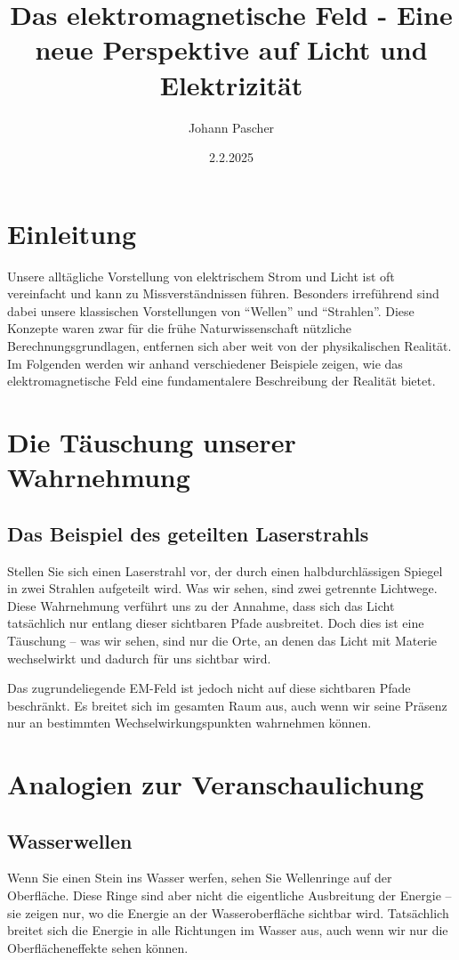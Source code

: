\documentclass[12pt,a4paper]{article}
\title{Das elektromagnetische Feld - Eine neue Perspektive auf Licht und Elektrizität}
\author{Johann Pascher}
\date{2.2.2025}
\begin{document}
\maketitle

\section*{Einleitung}
Unsere alltägliche Vorstellung von elektrischem Strom und Licht ist oft vereinfacht und kann zu Missverständnissen führen. Besonders irreführend sind dabei unsere klassischen Vorstellungen von ``Wellen'' und ``Strahlen''. Diese Konzepte waren zwar für die frühe Naturwissenschaft nützliche Berechnungsgrundlagen, entfernen sich aber weit von der physikalischen Realität. Im Folgenden werden wir anhand verschiedener Beispiele zeigen, wie das elektromagnetische Feld eine fundamentalere Beschreibung der Realität bietet.

\section{Die Täuschung unserer Wahrnehmung}
\subsection{Das Beispiel des geteilten Laserstrahls}
Stellen Sie sich einen Laserstrahl vor, der durch einen halbdurchlässigen Spiegel in zwei Strahlen aufgeteilt wird. Was wir sehen, sind zwei getrennte Lichtwege. Diese Wahrnehmung verführt uns zu der Annahme, dass sich das Licht tatsächlich nur entlang dieser sichtbaren Pfade ausbreitet. Doch dies ist eine Täuschung -- was wir sehen, sind nur die Orte, an denen das Licht mit Materie wechselwirkt und dadurch für uns sichtbar wird.

Das zugrundeliegende EM-Feld ist jedoch nicht auf diese sichtbaren Pfade beschränkt. Es breitet sich im gesamten Raum aus, auch wenn wir seine Präsenz nur an bestimmten Wechselwirkungspunkten wahrnehmen können.

\section{Analogien zur Veranschaulichung}
\subsection{Wasserwellen}
Wenn Sie einen Stein ins Wasser werfen, sehen Sie Wellenringe auf der Oberfläche. Diese Ringe sind aber nicht die eigentliche Ausbreitung der Energie -- sie zeigen nur, wo die Energie an der Wasseroberfläche sichtbar wird. Tatsächlich breitet sich die Energie in alle Richtungen im Wasser aus, auch wenn wir nur die Oberflächeneffekte sehen können.
\end{document}
